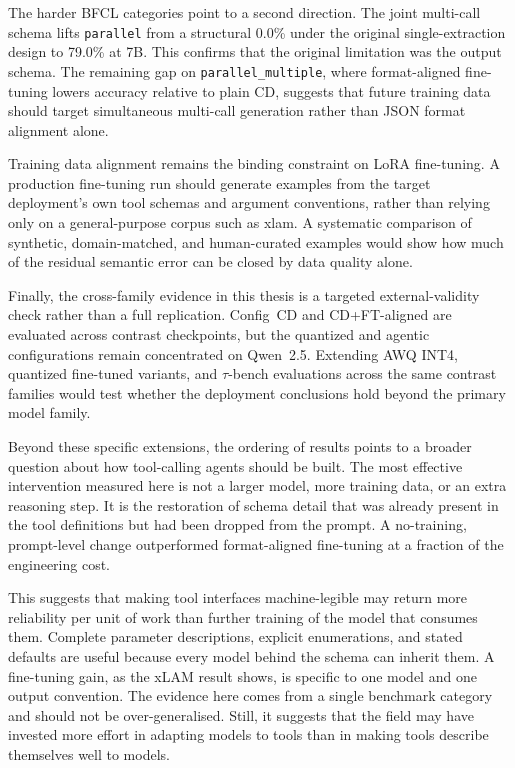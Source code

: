 The harder BFCL categories point to a second direction. The joint multi-call schema lifts \texttt{parallel} from a structural 0.0\% under the original single-extraction design to 79.0\% at 7B. This confirms that the original limitation was the output schema. The remaining gap on \texttt{parallel\_multiple}, where format-aligned fine-tuning lowers accuracy relative to plain CD, suggests that future training data should target simultaneous multi-call generation rather than JSON format alignment alone.

Training data alignment remains the binding constraint on LoRA fine-tuning. A production fine-tuning run should generate examples from the target deployment's own tool schemas and argument conventions, rather than relying only on a general-purpose corpus such as xlam. A systematic comparison of synthetic, domain-matched, and human-curated examples would show how much of the residual semantic error can be closed by data quality alone.

Finally, the cross-family evidence in this thesis is a targeted external-validity check rather than a full replication. Config~CD and CD+FT-aligned are evaluated across contrast checkpoints, but the quantized and agentic configurations remain concentrated on Qwen~2.5. Extending AWQ INT4, quantized fine-tuned variants, and $\tau$-bench evaluations across the same contrast families would test whether the deployment conclusions hold beyond the primary model family.

Beyond these specific extensions, the ordering of results points to a broader question about how tool-calling agents should be built. The most effective intervention measured here is not a larger model, more training data, or an extra reasoning step. It is the restoration of schema detail that was already present in the tool definitions but had been dropped from the prompt. A no-training, prompt-level change outperformed format-aligned fine-tuning at a fraction of the engineering cost.

This suggests that making tool interfaces machine-legible may return more reliability per unit of work than further training of the model that consumes them. Complete parameter descriptions, explicit enumerations, and stated defaults are useful because every model behind the schema can inherit them. A fine-tuning gain, as the xLAM result shows, is specific to one model and one output convention. The evidence here comes from a single benchmark category and should not be over-generalised. Still, it suggests that the field may have invested more effort in adapting models to tools than in making tools describe themselves well to models.
